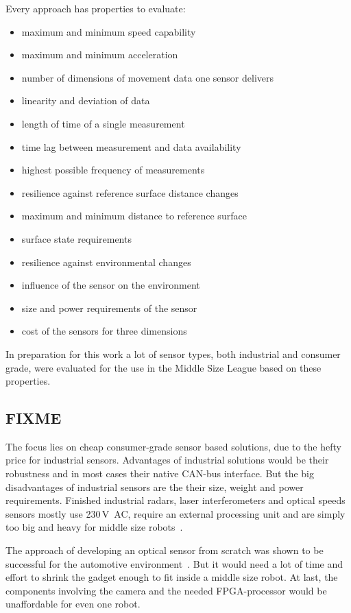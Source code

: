 \documentclass[12pt,a4paper]{article}
\newcommand{\MSL}{Middle Size League\xspace}
\begin{document}
Every approach has properties to evaluate:
\begin{itemize}
  \item maximum and minimum speed capability
  \item maximum and minimum acceleration
  \item number of dimensions of movement data one sensor delivers
  \item linearity and deviation of data
  \item length of time of a single measurement
  \item time lag between measurement and data availability
  \item highest possible frequency of measurements
  \item resilience against reference surface distance changes
  \item maximum and minimum distance to reference surface
  \item surface state requirements
  \item resilience against environmental changes
  \item influence of the sensor on the environment 
  \item size and power requirements of the sensor
  \item cost of the sensors for three dimensions
\end{itemize}

In preparation for this work a lot of sensor types, both industrial and consumer grade, were evaluated for the use in the \MSL based on these properties.

\subsection{FIXME}

The focus lies on cheap consumer-grade sensor based solutions, due to the hefty price for industrial sensors.
Advantages of industrial solutions would be their robustness and in most cases their native CAN-bus interface.
But the big disadvantages of industrial sensors are the their size, weight and power requirements.
Finished industrial radars, laser interferometers and optical speeds sensors mostly use 230\,V~AC, require an external processing unit and are simply too big and heavy for middle size robots~\cite{laser_vel, opt_vel, s_r_radar}.

The approach of developing an optical sensor from scratch was shown to be successful for the automotive environment~\cite{Hrach2006}.
But it would need a lot of time and effort to shrink the gadget enough to fit inside a middle size robot.
At last, the components involving the camera and the needed FPGA-processor would be unaffordable for even one robot.
\end{document}
